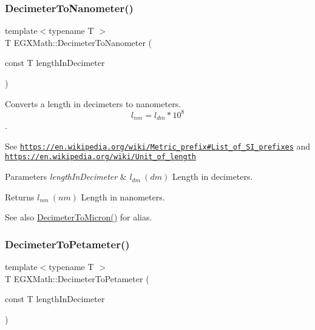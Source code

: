 \subsubsection{\texorpdfstring{Decimeter\+To\+Nanometer()}{DecimeterToNanometer()}}
{\footnotesize\ttfamily template$<$typename T $>$ \\
T E\+G\+X\+Math\+::\+Decimeter\+To\+Nanometer (\begin{DoxyParamCaption}\item[{const T}]{length\+In\+Decimeter }\end{DoxyParamCaption})}



Converts a length in decimeters to nanometers. \[ l_{nm}=l_{dm} * 10^{8} \]. 

See \href{https://en.wikipedia.org/wiki/Metric_prefix#List_of_SI_prefixes}{\tt https\+://en.\+wikipedia.\+org/wiki/\+Metric\+\_\+prefix\#\+List\+\_\+of\+\_\+\+S\+I\+\_\+prefixes} and \href{https://en.wikipedia.org/wiki/Unit_of_length}{\tt https\+://en.\+wikipedia.\+org/wiki/\+Unit\+\_\+of\+\_\+length} 
\begin{DoxyParams}{Parameters}
{\em length\+In\+Decimeter} & $ l_{dm}\ (dm)$ Length in decimeters. \\
\hline
\end{DoxyParams}
\begin{DoxyReturn}{Returns}
$ l_{nm}\ (nm)$ Length in nanometers. 
\end{DoxyReturn}
\begin{DoxySeeAlso}{See also}
\mbox{\hyperlink{group___e_g_x_math-_conversions-_length_conversions-_decimeter-_non-_s_i_gaebafc6e167156bb5158e5d335b25334b}{Decimeter\+To\+Micron()}} for alias. 
\end{DoxySeeAlso}
\mbox{\label{group___e_g_x_math-_conversions-_length_conversions-_decimeter-_s_i_gaaaaf9805ec7a853f4d9ae242baf3908a}} 
\subsubsection{\texorpdfstring{Decimeter\+To\+Petameter()}{DecimeterToPetameter()}}
{\footnotesize\ttfamily template$<$typename T $>$ \\
T E\+G\+X\+Math\+::\+Decimeter\+To\+Petameter (\begin{DoxyParamCaption}\item[{const T}]{length\+In\+Decimeter }\end{DoxyParamCaption})}



